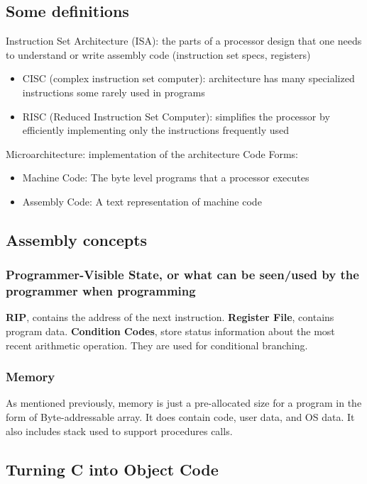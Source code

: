 \subsection{Some definitions}
Instruction Set Architecture (ISA): the parts of a processor design that one
needs to understand or write assembly code (instruction set specs, registers)
\begin{itemize}
    \item CISC (complex instruction set computer): architecture has many specialized instructions some rarely used in programs
    \item RISC (Reduced Instruction Set Computer): simplifies the processor by efficiently
implementing only the instructions frequently used
\end{itemize}
Microarchitecture: implementation of the architecture 
Code Forms:
\begin{itemize}
    \item Machine Code: The byte level programs that a processor executes
    \item Assembly Code: A text representation of machine code
\end{itemize}

\subsection{Assembly concepts}

\subsubsection{Programmer-Visible State, or what can be seen/used by the programmer when programming}

\textbf{RIP}, contains the address of the next instruction. 
\textbf{Register File}, contains program data.
\textbf{Condition Codes}, store status information about the most recent arithmetic operation. They are used for conditional branching. 

\subsubsection{Memory}
As mentioned previously, memory is just a pre-allocated size for a program in the form of Byte-addressable array. It does contain code, user data, and OS data. It also includes stack used to support procedures calls.

\subsection{Turning C into Object Code}

